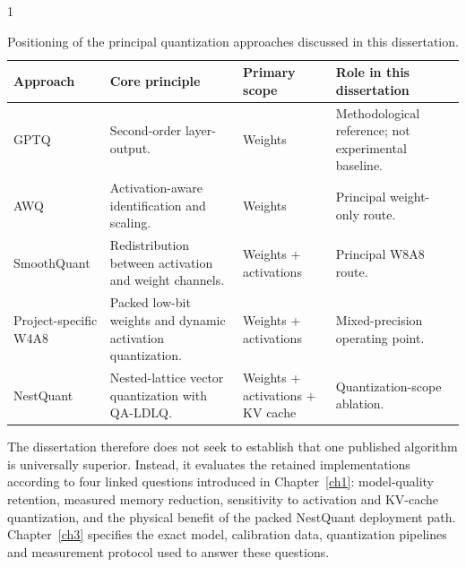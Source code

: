 \begin{table}[htbp]
\centering
\caption{Positioning of the principal quantization approaches discussed
in this dissertation.}
\label{tab:related-work-positioning}

\begin{spacing}{1}
\small
\renewcommand{\arraystretch}{1.18}
\setlength{\tabcolsep}{4pt}

\begin{tabularx}{\textwidth}{@{}
>{\raggedright\arraybackslash}p{}
>{\raggedright\arraybackslash}X
>{\raggedright\arraybackslash}p{}
>{\raggedright\arraybackslash}X
@{}}
\toprule
\textbf{Approach} &
\textbf{Core principle} &
\textbf{Primary scope} &
\textbf{Role in this dissertation} \\
\midrule

GPTQ &
Second-order layer-output. &
Weights &
Methodological reference; not experimental baseline. \\

AWQ &
Activation-aware identification and scaling. &
Weights &
Principal weight-only route. \\

SmoothQuant &
Redistribution between activation and weight channels. &
Weights + activations &
Principal W8A8 route. \\

Project-specific W4A8 &
Packed low-bit weights and dynamic activation quantization. &
Weights + activations &
Mixed-precision operating point. \\

NestQuant &
Nested-lattice vector quantization with QA-LDLQ. &
Weights + activations + KV cache &
Quantization-scope ablation. \\

\bottomrule
\end{tabularx}
\end{spacing}
\end{table}

The dissertation therefore does not seek to establish that one published
algorithm is universally superior. Instead, it evaluates the retained
implementations according to four linked questions introduced in
Chapter~\ref{ch1}: model-quality retention, measured memory reduction,
sensitivity to activation and KV-cache quantization, and the physical
benefit of the packed NestQuant deployment path. Chapter~\ref{ch3}
specifies the exact model, calibration data, quantization pipelines and
measurement protocol used to answer these questions.

